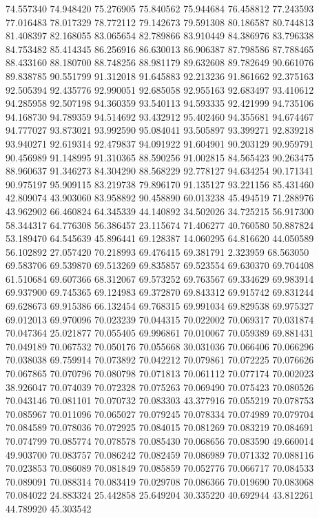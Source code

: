 74.557340
74.948420
75.276905
75.840562
75.944684
76.458812
77.243593
77.016483
78.017329
78.772112
79.142673
79.591308
80.186587
80.744813
81.408397
82.168055
83.065654
82.789866
83.910449
84.386976
83.796338
84.753482
85.414345
86.256916
86.630013
86.906387
87.798586
87.788465
88.433160
88.180700
88.748256
88.981179
89.632608
89.782649
90.661076
89.838785
90.551799
91.312018
91.645883
92.213236
91.861662
92.375163
92.505394
92.435776
92.990051
92.685058
92.955163
92.683497
93.410612
94.285958
92.507198
94.360359
93.540113
94.593335
92.421999
94.735106
94.168730
94.789359
94.514692
93.432912
95.402460
94.355681
94.674467
94.777027
93.873021
93.992590
95.084041
93.505897
93.399271
92.839218
93.940271
92.619314
92.479837
94.091922
91.604901
90.203129
90.959791
90.456989
91.148995
91.310365
88.590256
91.002815
84.565423
90.263475
88.960637
91.346273
84.304290
88.568229
92.778127
94.634254
90.171341
90.975197
95.909115
83.219738
79.896170
91.135127
93.221156
85.431460
42.809074
43.903060
83.958892
90.458890
60.013238
45.494519
71.288976
43.962902
66.460824
64.345339
44.140892
34.502026
34.725215
56.917300
58.344317
64.776308
56.386457
23.115674
71.406277
40.760580
50.887824
53.189470
64.545639
45.896441
69.128387
14.060295
64.816620
44.050589
56.102892
27.057420
70.218993
69.476415
69.381791
2.323959
68.563050
69.583706
69.539870
69.513269
69.835857
69.523554
69.630370
69.704408
61.510684
69.607366
68.312067
69.573252
69.763567
69.334629
69.983914
69.937900
69.745365
69.124983
69.372870
69.843312
69.915742
69.831244
69.628673
69.915386
66.132454
69.768315
69.991034
69.829538
69.975327
69.012013
69.970096
70.023239
70.044315
70.022002
70.069317
70.031874
70.047364
25.021877
70.055405
69.996861
70.010067
70.059389
69.881431
70.049189
70.067532
70.050176
70.055668
30.031036
70.066406
70.066296
70.038038
69.759914
70.073892
70.042212
70.079861
70.072225
70.076626
70.067865
70.070796
70.080798
70.071813
70.061112
70.077174
70.002023
38.926047
70.074039
70.072328
70.075263
70.069490
70.075423
70.080526
70.043146
70.081101
70.070732
70.083303
43.377916
70.055219
70.078753
70.085967
70.011096
70.065027
70.079245
70.078334
70.074989
70.079704
70.084589
70.078036
70.072925
70.084015
70.081269
70.083219
70.084691
70.074799
70.085774
70.078578
70.085430
70.068656
70.083590
49.660014
49.903700
70.083757
70.086242
70.082459
70.086989
70.071332
70.088116
70.023853
70.086089
70.081849
70.085859
70.052776
70.066717
70.084533
70.089091
70.088314
70.083419
70.029708
70.086366
70.019690
70.083068
70.084022
24.883324
25.442858
25.649204
30.335220
40.692944
43.812261
44.789920
45.303542
